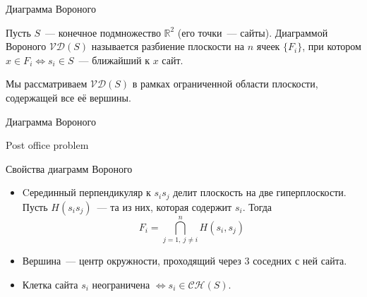 \documentclass[12pt,aspectratio=169,svgnames]{beamer}
\begin{document}
\maketitle

    \begin{frame}{Диаграмма Вороного}

        \begin{defn}

            Пусть $S$~--- конечное подмножество $\mathbb{R}^2$ (его точки~--- \alert{сайты}).
            Диаграммой Вороного $\mathcal{V}\mathcal{D}(S)$ называется разбиение плоскости на $n$ ячеек $\{ F_i \}$, при котором $x \in F_i
            \Leftrightarrow s_i \in S$~--- ближайший к $x$ \alert{сайт}.

        \end{defn}

        Мы рассматриваем $\mathcal{V}\mathcal{D}(S)$ в рамках ограниченной области плоскости, содержащей все её
        вершины.

    \end{frame}

    \begin{frame}{Диаграмма Вороного}
        
        \begin{center}


        \end{center}

        
    \end{frame}

    \begin{frame}{Post office problem}
    \vspace{-17.5mm}
    \begin{center}


    \end{center}

    \end{frame}

    \begin{frame}{Свойства диаграмм Вороного}

        \begin{itemize}

            \item Cерединный перпендикуляр к $s_i s_j$ делит плоскость на две гиперплоскости. Пусть $H(s_i s_j)$~--- та из них, которая содержит $s_i$.
                  Тогда
                  \[ F_i = \bigcap\limits_{j = 1, \ j \neq i}^{n} H(s_i, s_j)\]

            \item Вершина~--- центр окружности, проходящий через 3 соседних с ней сайта.

            \item Клетка сайта $s_i$ неограничена $\Leftrightarrow s_i \in \mathcal{C}\mathcal{H}(S)$.

        \end{itemize}

    \end{frame}
\end{document}
